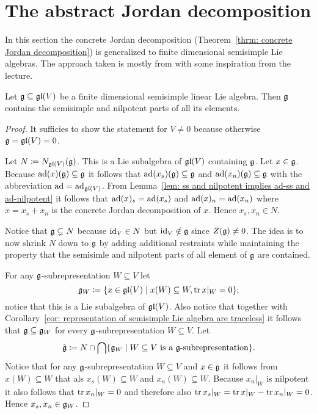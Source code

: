\section{The abstract Jordan decomposition}
In this section the concrete Jordan decomposition (Theorem~\ref{thrm: concrete Jordan decomposition}) is generalized to finite dimensional semisimple Lie algebras. The approach taken is mostly from \cite[\S 4.2, \S 5.3, \S 5.4, \S 6.4]{Humphreys} with some inspiration from the lecture.


\begin{lem}
 Let $\mathfrak{g} \subseteq \mathfrak{gl}(V)$ be a finite dimensional semisimple linear Lie algebra. Then $\mathfrak{g}$ contains the semisimple and nilpotent parts of all its elements.
\end{lem}
\begin{proof}
 It sufficies to show the statement for $V \neq 0$ because otherwise $\mathfrak{g} = \mathfrak{gl}(V) = 0$.
 
 Let $N \coloneqq N_{\mathfrak{gl}(V)}(\mathfrak{g})$. This is a Lie subalgebra of $\mathfrak{gl}(V)$ containing $\mathfrak{g}$. Let $x \in \mathfrak{g}$. Because $\operatorname{ad}(x)(\mathfrak{g}) \subseteq \mathfrak{g}$ it follows that $\operatorname{ad}(x_s)(\mathfrak{g}) \subseteq \mathfrak{g}$ and $\operatorname{ad}(x_n)(\mathfrak{g}) \subseteq \mathfrak{g}$ with the abbreviation $\operatorname{ad} = \operatorname{ad}_{\mathfrak{gl}(V)}$. From Lemma~\ref{lem: ss and nilpotent implies ad-ss and ad-nilpotent} it follows that $\operatorname{ad}(x)_s = \operatorname{ad}(x_s)$ and $\operatorname{ad}(x)_n = \operatorname{ad}(x_n)$ where $x = x_s + x_n$ is the concrete Jordan decomposition of $x$. Hence $x_s, x_n \in N$.
 
 Notice that $\mathfrak{g} \subsetneq N$ because $\operatorname{id}_V \in N$ but $\operatorname{id}_V \notin \mathfrak{g}$ since $Z(\mathfrak{g}) \neq 0$. The idea is to now shrink $N$ down to $\mathfrak{g}$ by adding additional restraints while maintaining the property that the semisimle and nilpotent parts of all element of $\mathfrak{g}$ are contained.
 
 For any $\mathfrak{g}$-subrepresentation $W \subseteq V$ let
 \[
  \mathfrak{g}_W \coloneqq \{x \in \mathfrak{gl}(V) \mid x(W) \subseteq W, \operatorname{tr} x|_W = 0\};
 \]
 notice that this is a Lie subalgebra of $\mathfrak{gl}(V)$. Also notice that together with Corollary~\ref{cor: representation of semisimple Lie algebra are traceless} it follows that $\mathfrak{g} \subseteq \mathfrak{g}_W$ for every $\mathfrak{g}$-subrepresentation $W \subseteq V$. Let
 \[
  \hat{\mathfrak{g}} \coloneqq N \cap \bigcap \{\mathfrak{g}_W \mid \text{$W \subseteq V$ is a $\mathfrak{g}$-subrepresentation}\}.
 \]
 Notice that for any $\mathfrak{g}$-subrepresentation $W \subseteq V$ and $x \in \mathfrak{g}$ it follows from $x(W) \subseteq W$ that als $x_s(W) \subseteq W$ and $x_n(W) \subseteq W$. Because $x_n|_W$ is nilpotent it also follows that $\operatorname{tr} x_n|_W = 0$ and therefore also $\operatorname{tr} x_s|_W = \operatorname{tr} x|_W - \operatorname{tr} x_n|_W = 0$. Hence $x_s, x_n \in \mathfrak{g}_W$.
 

\end{proof}
